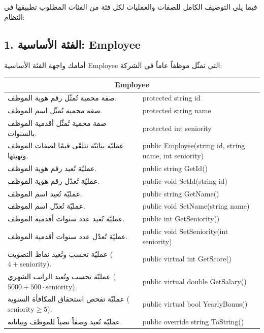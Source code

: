 \documentclass[14pt]{extarticle}
\begin{document}
فيما يلي التوصيف الكامل للصفات والعمليات لكل فئة من الفئات المطلوب تطبيقها في النظام:

\subsection*{1. الفئة الأساسية: \textenglish{Employee}}
أمامك واجهة الفئة الأساسية \textenglish{Employee} التي تمثّل موظفاً عاماً في الشركة:

\begin{center}
\renewcommand{\arraystretch}{1.5}
{\small
\begin{tabular}{|p{}|p{}|}
\hline
\multicolumn{2}{|c|}{\textbf{\textenglish{Employee}}} \\
\hline
صفة محمية تُمثّل رقم هوية الموظف. & \textenglish{protected string id} \\
\hline
صفة محمية تُمثّل اسم الموظف. & \textenglish{protected string name} \\
\hline
صفة محمية تُمثّل أقدمية الموظف بالسنوات. & \textenglish{protected int seniority} \\
\hline
عمليّة بنائيّة تتلقّى قيمًا لصفات الموظف وتهيئها. & \textenglish{public Employee(string id, string name, int seniority)} \\
\hline
عمليّة تُعيد رقم هوية الموظف. & \textenglish{public string GetId()} \\
\hline
عمليّة تُعدّل رقم هوية الموظف. & \textenglish{public void SetId(string id)} \\
\hline
عمليّة تُعيد اسم الموظف. & \textenglish{public string GetName()} \\
\hline
عمليّة تُعدّل اسم الموظف. & \textenglish{public void SetName(string name)} \\
\hline
عمليّة تُعيد عدد سنوات أقدمية الموظف. & \textenglish{public int GetSeniority()} \\
\hline
عمليّة تُعدّل عدد سنوات أقدمية الموظف. & \textenglish{public void SetSeniority(int seniority)} \\
\hline
عمليّة تحسب وتُعيد نقاط التصويت ($4 + \text{seniority}$). & \textenglish{public virtual int GetScore()} \\
\hline
عمليّة تحسب وتُعيد الراتب الشهري ($5000 + 500 \cdot \text{seniority}$). & \textenglish{public virtual double GetSalary()} \\
\hline
عمليّة تفحص استحقاق المكافأة السنوية ($\text{seniority} \ge 5$). & \textenglish{public virtual bool YearlyBonus()} \\
\hline
عمليّة تُعيد وصفاً نصياً للموظف وبياناته. & \textenglish{public override string ToString()} \\
\hline
\end{tabular}
}
\end{center}
\end{document}
